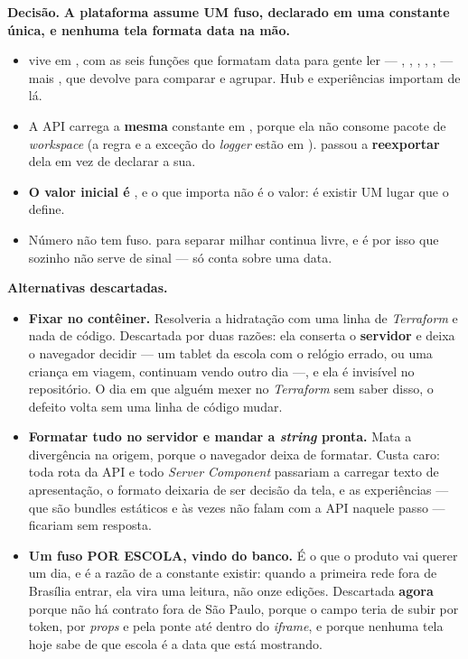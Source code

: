 \textbf{Decisão.} \textbf{A plataforma assume UM fuso, declarado em uma
constante única, e nenhuma tela formata data na mão.}

\begin{itemize}
  \item {} vive em , com
    as seis funções que formatam data para gente ler --- ,
    , , , ,
     --- mais , que devolve
     para comparar e agrupar. Hub e experiências importam de lá.
  \item A API carrega a \textbf{mesma} constante em
    , porque ela não consome pacote de
    \emph{workspace} (a regra e a exceção do \emph{logger} estão em
    ).  passou a
    \textbf{reexportar} dela em vez de declarar a sua.
  \item \textbf{O valor inicial é }, e o que importa não
    é o valor: é existir UM lugar que o define.
  \item Número não tem fuso.  para separar milhar
    continua livre, e é por isso que  sozinho não serve de
    sinal --- só conta sobre uma data.
\end{itemize}

\textbf{Alternativas descartadas.}

\begin{itemize}
  \item \textbf{Fixar  no contêiner.} Resolveria a
    hidratação com uma linha de \emph{Terraform} e nada de código. Descartada
    por duas razões: ela conserta o \textbf{servidor} e deixa o navegador
    decidir --- um tablet da escola com o relógio errado, ou uma criança em
    viagem, continuam vendo outro dia ---, e ela é invisível no repositório. O
    dia em que alguém mexer no \emph{Terraform} sem saber disso, o defeito
    volta sem uma linha de código mudar.
  \item \textbf{Formatar tudo no servidor e mandar a \emph{string} pronta.}
    Mata a divergência na origem, porque o navegador deixa de formatar. Custa
    caro: toda rota da API e todo \emph{Server Component} passariam a carregar
    texto de apresentação, o formato deixaria de ser decisão da tela, e as
    experiências --- que são bundles estáticos e às vezes não falam com a API
    naquele passo --- ficariam sem resposta.
  \item \textbf{Um fuso POR ESCOLA, vindo do banco.} É o que o produto vai
    querer um dia, e é a razão de a constante existir: quando a primeira rede
    fora de Brasília entrar, ela vira uma leitura, não onze edições. Descartada
    \textbf{agora} porque não há contrato fora de São Paulo, porque o campo
    teria de subir por token, por \emph{props} e pela ponte 
    até dentro do \emph{iframe}, e porque nenhuma tela hoje sabe de que escola é
    a data que está mostrando.
\end{itemize}

